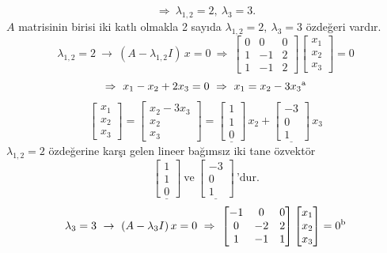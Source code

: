 \documentclass[11pt,a4paper]{article}
\begin{document}
\begin{cozum}
\[ \Rightarrow\ \lambda_{1,2}=2,\ \lambda_3=3. \]
$A$ matrisinin birisi iki katlı olmakla 2 sayıda $\lambda_{1,2}=2,\ \lambda_3=3$ özdeğeri vardır.
\[
  \lambda_{1,2}=2 \ \rightarrow\ (A-\lambda_{1,2}I)\,x=0 \ \Rightarrow\
  \begin{bmatrix}0&0&0\\1&-1&2\\1&-1&2\end{bmatrix}\begin{bmatrix}x_1\\x_2\\x_3\end{bmatrix}=0
\]
\[
  \Rightarrow\ x_1-x_2+2x_3=0 \ \Rightarrow\ x_1=x_2-3x_3\stepcounter{mpfootnote}\textsuperscript{\thempfootnote}
\]
\[
  \begin{bmatrix}x_1\\x_2\\x_3\end{bmatrix}=\begin{bmatrix}x_2-3x_3\\x_2\\x_3\end{bmatrix}
  =\underline{\begin{bmatrix}1\\1\\0\end{bmatrix}}\,x_2+\underline{\begin{bmatrix}-3\\0\\1\end{bmatrix}}\,x_3
\]
\underline{$\lambda_{1,2}$}$=2$ özdeğerine karşı gelen lineer bağımsız iki tane özvektör
\[
  \underline{\begin{bmatrix}1\\1\\0\end{bmatrix}}\ \text{ve}\ \underline{\begin{bmatrix}-3\\0\\1\end{bmatrix}}\,\text{'dur.}
\]
\[
  \lambda_3=3 \ \rightarrow\ (A-\lambda_3 I)\,x=0 \ \Rightarrow\
  \begin{bmatrix}-1&0&0\\0&-2&2\\1&-1&1\end{bmatrix}\begin{bmatrix}x_1\\x_2\\x_3\end{bmatrix}=0\stepcounter{mpfootnote}\textsuperscript{\thempfootnote}
\]
\end{cozum}
\end{document}

